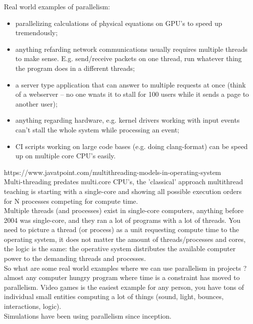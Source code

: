 \documentclass[11pt, a4paper, oneside]{article}
\theoremstyle{definition}
\begin{document}
Real world examples of parallelism:\\
\begin{itemize}
	\item parallelizing calculations of physical equations on GPU's to speed up tremendously;
	\item anything refarding network communications usually requires multiple threads to make sense. E.g. send/receive packets on one thread, run whatever thing the program does in a different threads;
	\item a server type application that can answer to multiple requests at once (think of a webserver -- no one wnats it to stall for 100 users while it sends a page to another user);
	\item anything regarding hardware, e.g. kernel drivers working with input events can't stall the whole system while processing an event;
	\item CI scripts working on large code bases (e.g. doing clang-format) can be speed up on multiple core CPU's easily.
\end{itemize}


https://www.javatpoint.com/multithreading-models-in-operating-system\\
Multi-threading predates multi.core CPU's, the 'classical' approach multithread teaching is starting with a single-core and showing all possible execution orders for N processes competing for compute time.\\
Multiple threads (and processes) exist in single-core computers, anything before 2004 was single-core, and they ran a lot of programs with a lot of threads. You need to picture a thread (or process) as a unit requesting compute time to the operating system, it does not matter the amount of threads/processes and cores, the logic is the same: the operative system distributes the available computer power to the demanding threads and processes.\\

So what are some real world examples where we can use parallelism in projects ?\\
almost any computer hungry program where time is a constraint has moved to parallelism. Video games is the easiest example for any person, you have tons of individual small entities computing a lot of things (sound, light, bounces, interactions, logic).\\
Simulations have been using parallelism since inception.\\
\end{document}
